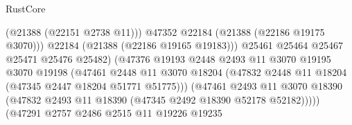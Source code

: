 \begin{lexlean}{RustCore}
\begin{coremodule}
                                                  (@21388 (@22151 @2738 @11)))
                                                @47352
                                                @22184
                                                (@21388 (@22186 @19175 @3070)))
                                              @22184
                                              (@21388 (@22186 @19165 @19183)))
                                            @25461
                                            @25464
                                            @25467
                                            @25471
                                            @25476
                                            @25482)
                                          (@47376
                                            @19193
                                            @2448
                                            @2493
                                            @11
                                            @3070
                                            @19195
                                            @3070
                                            @19198
                                            (@47461
                                              @2448
                                              @11
                                              @3070
                                              @18204
                                              (@47832
                                                @2448
                                                @11
                                                @18204
                                                (@47345 @2447 @18204 @51771 @51775)))
                                            (@47461
                                              @2493
                                              @11
                                              @3070
                                              @18390
                                              (@47832
                                                @2493
                                                @11
                                                @18390
                                                (@47345 @2492 @18390 @52178 @52182)))))
                                        (@47291
                                          @2757
                                          @2486
                                          @2515
                                          @11
                                          @19226
                                          @19235

\end{coremodule}
\end{lexlean}
